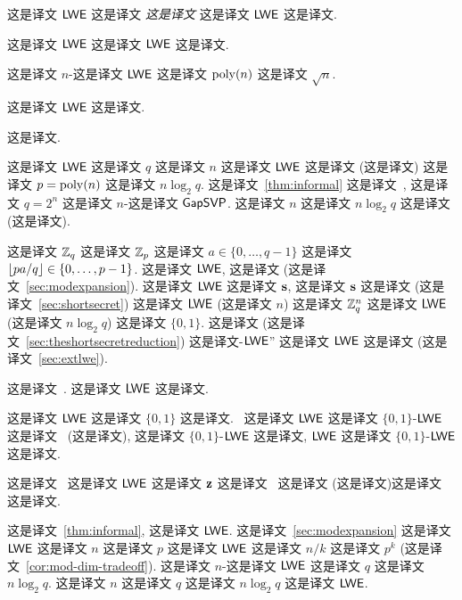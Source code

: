 这是译文 $\mathsf{LWE}$ 这是译文 \emph{这是译文} 这是译文 $\mathsf{LWE}$ 这是译文.

 这是译文 $\mathsf{LWE}$ 这是译文 $\mathsf{LWE}$ 这是译文.

\begin{theorem}[这是译文]\label{thm:informal} 这是译文 $n$-这是译文 $\mathsf{LWE}$ 这是译文 $\operatorname{poly}(n)$ 这是译文 $\sqrt{n}$.
\end{theorem}
这是译文 $\mathsf{LWE}$ 这是译文.

 这是译文.

这是译文 $\mathsf{LWE}$ 这是译文 $q$ 这是译文 $n$ 这是译文 $\mathsf{LWE}$ 这是译文 (这是译文) 这是译文 $p=\operatorname{poly}(n)$ 这是译文 $n \log_2 q$. 这是译文~\ref{thm:informal} 这是译文~\cite{DBLP:conf/stoc/Peikert09}, 这是译文 $q=2^n$ 这是译文 $n$-这是译文 $\mathsf{GapSVP}$. 这是译文 $n$ 这是译文 $n \log_2 q$ 这是译文 (这是译文).%

这是译文 $\mathbb{Z}_q$ 这是译文 $\mathbb{Z}_p$ 这是译文 $a \in \{0,\ldots,q-1\}$ 这是译文 $\lfloor pa/q\rfloor \in \{0,\ldots,p-1\}$. 这是译文 $\mathsf{LWE}$, 这是译文 (这是译文~\ref{sec:modexpansion}). 这是译文 $\mathsf{LWE}$ 这是译文 $\mathbf{s}$, 这是译文 $\mathbf{s}$ 这是译文 (这是译文~\ref{sec:shortsecret}) 这是译文 $\mathsf{LWE}$ (这是译文 $n$) 这是译文 $\mathbb{Z}_q^n$ 这是译文 $\mathsf{LWE}$ (这是译文 $n \log_2 q$) 这是译文 $\{0,1\}$. 这是译文 (这是译文~\ref{sec:theshortsecretreduction}) 这是译文-$\mathsf{LWE}$'' 这是译文 $\mathsf{LWE}$ 这是译文 (这是译文~\ref{sec:extlwe}).


这是译文~\cite{DBLP:conf/focs/BrakerskiV11,DBLP:conf/innovations/BrakerskiGV12,DBLP:conf/crypto/Brakerski12}. 这是译文 $\mathsf{LWE}$ 这是译文.


%
这是译文 $\mathsf{LWE}$ 这是译文 $\{0,1\}$ 这是译文.~\cite{DBLP:conf/innovations/GoldwasserKPV10} 这是译文 $\mathsf{LWE}$ 这是译文 $\{0,1\}$-$\mathsf{LWE}$ 这是译文~\cite{DBLP:conf/innovations/GoldwasserKPV10} (这是译文), 这是译文 $\{0,1\}$-$\mathsf{LWE}$ 这是译文, $\mathsf{LWE}$ 这是译文 $\{0,1\}$-$\mathsf{LWE}$ 这是译文.


这是译文~\cite{DBLP:conf/innovations/GoldwasserKPV10} 这是译文 $\mathsf{LWE}$ 这是译文 $\mathbf{z}$ 这是译文~\cite{DBLP:conf/crypto/ONeillPW11} 这是译文 (这是译文)这是译文~\cite{DBLP:conf/pkc/Alperin-SheriffP12} 这是译文.



 这是译文~\ref{thm:informal}, 这是译文 $\mathsf{LWE}$. 这是译文~\ref{sec:modexpansion} 这是译文 $\mathsf{LWE}$ 这是译文 $n$ 这是译文 $p$ 这是译文 $\mathsf{LWE}$ 这是译文 $n/k$ 这是译文 $p^k$ (这是译文~\ref{cor:mod-dim-tradeoff}). 这是译文 $n$-这是译文 $\mathsf{LWE}$ 这是译文 $q$ 这是译文 $n \log_2 q$. 这是译文 $n$ 这是译文 $q$ 这是译文 $n \log_2 q$ 这是译文 $\mathsf{LWE}$.

